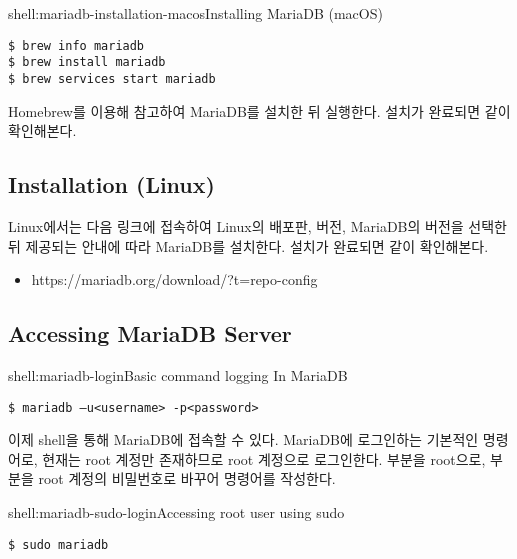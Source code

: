 \begin{shell}{shell:mariadb-installation-macos}{Installing MariaDB (macOS)}
\begin{verbatim}
$ brew info mariadb
$ brew install mariadb
$ brew services start mariadb
\end{verbatim}
\end{shell}

Homebrew를 이용해 \를 참고하여 MariaDB를 설치한 뒤 실행한다. 설치가 완료되면 \와 같이 확인해본다.

\subsection*{Installation (Linux)}\label{ssect:mariadb-install-linux}

Linux에서는 다음 링크에 접속하여 Linux의 배포판, 버전, MariaDB의 버전을 선택한 뒤 제공되는 안내에 따라 MariaDB를 설치한다. 설치가 완료되면 \와 같이 확인해본다.

\begin{itemize}
    \item https://mariadb.org/download/?t=repo-config
\end{itemize}

\subsection*{Accessing MariaDB Server}

\begin{shell}{shell:mariadb-login}{Basic command logging In MariaDB}
\begin{verbatim}
$ mariadb –u<username> -p<password>
\end{verbatim}
\end{shell}

이제 shell을 통해 MariaDB에 접속할 수 있다. \은 MariaDB에 로그인하는 기본적인 명령어로, 현재는 root 계정만 존재하므로 root 계정으로 로그인한다.  부분을 root으로,  부분을 root 계정의 비밀번호로 바꾸어 명령어를 작성한다.

\begin{shell}{shell:mariadb-sudo-login}{Accessing root user using sudo}
\begin{verbatim}
$ sudo mariadb
\end{verbatim}
\end{shell}

